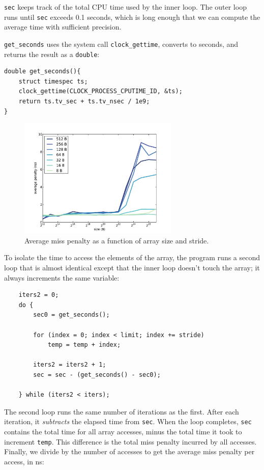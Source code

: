 \documentclass[12pt]{book}
\begin{document}
{{\tt sec} keeps track of the total CPU time used by the inner loop.
The outer loop runs until {\tt sec} exceeds 0.1 seconds, which is
long enough that we can compute the average time with sufficient
precision.

\verb"get_seconds" uses the system call \verb"clock_gettime",
converts to seconds, and returns the result as a {\tt double}:

\begin{verbatim}
double get_seconds(){
    struct timespec ts;
    clock_gettime(CLOCK_PROCESS_CPUTIME_ID, &ts);
    return ts.tv_sec + ts.tv_nsec / 1e9;
}
\end{verbatim}

\begin{figure}
\centerline{\includegraphics[width=3in]{figs/cache_data.pdf}}
\caption{Average miss penalty as a function of array size and stride.}
\label{cachedata}
\end{figure}

To isolate the time to access the elements of the array,
the program runs a second loop that is almost identical except
that the inner loop doesn't touch the array; it always increments
the same variable:

\begin{verbatim}
    iters2 = 0;
    do {
        sec0 = get_seconds();
        
        for (index = 0; index < limit; index += stride) 
            temp = temp + index;
        
        iters2 = iters2 + 1;
        sec = sec - (get_seconds() - sec0);

    } while (iters2 < iters);
\end{verbatim}

The second loop runs the same number of iterations as the first.
After each iteration, it {\em subtracts} the elapsed time from
{\tt sec}.  When the loop completes, {\tt sec} contains the total
time for all array accesses, minus the total time it took to increment
{\tt temp}.  This difference is the total miss penalty incurred by
all accesses.  Finally, we divide by the number of accesses to
get the average miss penalty per access, in ns:

}
\end{document}
